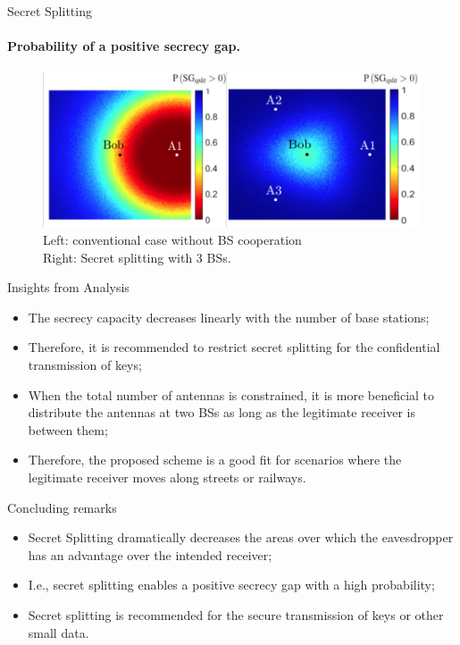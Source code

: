 \begin{frame}{Secret Splitting}
    \framesubtitle{Probability of a positive secrecy gap.}

    \begin{figure}
        \centering
        \includegraphics[scale=0.4]{figures/enabling_positive_secrecy_gap/SS_area.PNG}
        \caption{Left: conventional case without BS cooperation\\
        Right: Secret splitting with 3 BSs.}
        \label{fig:enter-label}
    \end{figure}
\end{frame}

\begin{frame}{Insights from Analysis}
\begin{itemize}

\item The secrecy capacity decreases linearly with the number of base stations;
\item Therefore, it is recommended to restrict secret splitting for the confidential transmission of keys;
\item When the total number of antennas is constrained, it is more beneficial to distribute the antennas at two BSs as long as the legitimate receiver is between them;
\item Therefore, the proposed scheme is a good fit for scenarios where the legitimate receiver moves along streets or railways.
\end{itemize}
\end{frame}

\begin{frame}{Concluding remarks}
\begin{itemize}
    \item Secret Splitting dramatically decreases the areas over which the eavesdropper has an advantage over the intended receiver;
    \item I.e., secret splitting enables a positive secrecy gap with a high probability;
    \item Secret splitting is recommended for the secure transmission of keys or other small data. 
\end{itemize}
    
\end{frame}